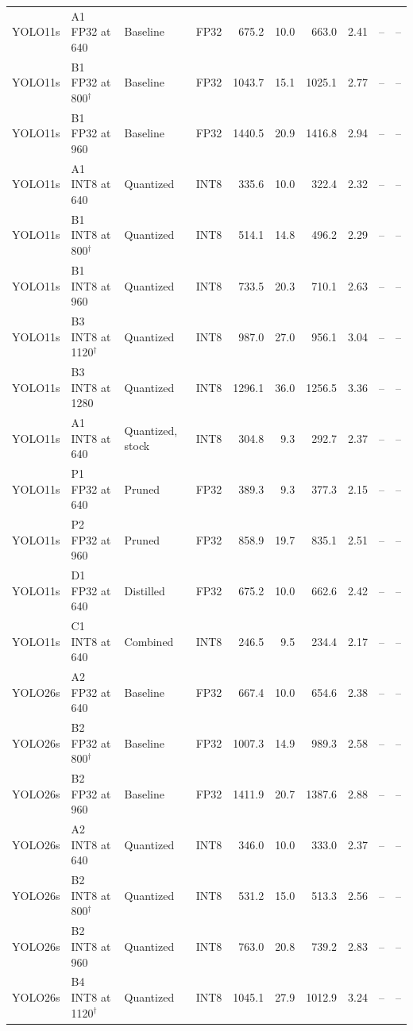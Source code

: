 \begin{longtable}{llllrrrrrr}
YOLO11s & A1 FP32 at 640 & Baseline & FP32 & 675.2 & 10.0 & 663.0 & 2.41 & -- & -- \\
YOLO11s & B1 FP32 at 800$^{\dagger}$ & Baseline & FP32 & 1043.7 & 15.1 & 1025.1 & 2.77 & -- & -- \\
YOLO11s & B1 FP32 at 960 & Baseline & FP32 & 1440.5 & 20.9 & 1416.8 & 2.94 & -- & -- \\
YOLO11s & A1 INT8 at 640 & Quantized & INT8 & 335.6 & 10.0 & 322.4 & 2.32 & -- & -- \\
YOLO11s & B1 INT8 at 800$^{\dagger}$ & Quantized & INT8 & 514.1 & 14.8 & 496.2 & 2.29 & -- & -- \\
YOLO11s & B1 INT8 at 960 & Quantized & INT8 & 733.5 & 20.3 & 710.1 & 2.63 & -- & -- \\
YOLO11s & B3 INT8 at 1120$^{\dagger}$ & Quantized & INT8 & 987.0 & 27.0 & 956.1 & 3.04 & -- & -- \\
YOLO11s & B3 INT8 at 1280 & Quantized & INT8 & 1296.1 & 36.0 & 1256.5 & 3.36 & -- & -- \\
YOLO11s & A1 INT8 at 640 & Quantized, stock & INT8 & 304.8 & 9.3 & 292.7 & 2.37 & -- & -- \\
YOLO11s & P1 FP32 at 640 & Pruned & FP32 & 389.3 & 9.3 & 377.3 & 2.15 & -- & -- \\
YOLO11s & P2 FP32 at 960 & Pruned & FP32 & 858.9 & 19.7 & 835.1 & 2.51 & -- & -- \\
YOLO11s & D1 FP32 at 640 & Distilled & FP32 & 675.2 & 10.0 & 662.6 & 2.42 & -- & -- \\
YOLO11s & C1 INT8 at 640 & Combined & INT8 & 246.5 & 9.5 & 234.4 & 2.17 & -- & -- \\
YOLO26s & A2 FP32 at 640 & Baseline & FP32 & 667.4 & 10.0 & 654.6 & 2.38 & -- & -- \\
YOLO26s & B2 FP32 at 800$^{\dagger}$ & Baseline & FP32 & 1007.3 & 14.9 & 989.3 & 2.58 & -- & -- \\
YOLO26s & B2 FP32 at 960 & Baseline & FP32 & 1411.9 & 20.7 & 1387.6 & 2.88 & -- & -- \\
YOLO26s & A2 INT8 at 640 & Quantized & INT8 & 346.0 & 10.0 & 333.0 & 2.37 & -- & -- \\
YOLO26s & B2 INT8 at 800$^{\dagger}$ & Quantized & INT8 & 531.2 & 15.0 & 513.3 & 2.56 & -- & -- \\
YOLO26s & B2 INT8 at 960 & Quantized & INT8 & 763.0 & 20.8 & 739.2 & 2.83 & -- & -- \\
YOLO26s & B4 INT8 at 1120$^{\dagger}$ & Quantized & INT8 & 1045.1 & 27.9 & 1012.9 & 3.24 & -- & -- \\

\end{longtable}
